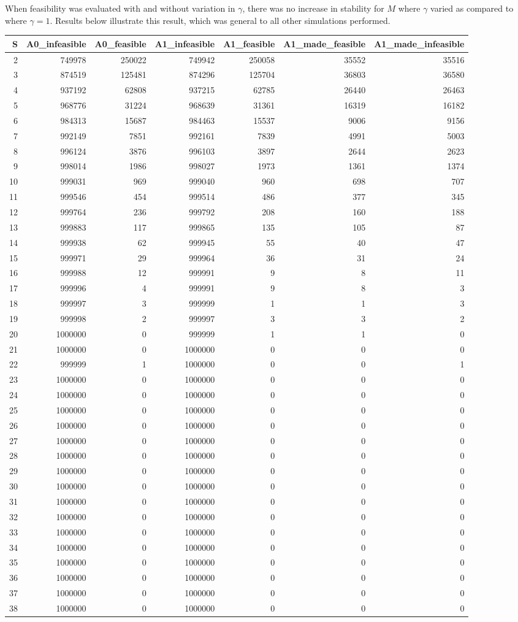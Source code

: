 \documentclass[]{article}
\begin{document}
When feasibility was evaluated with and without variation in \(\gamma\),
there was no increase in stability for \(M\) where \(\gamma\) varied as
compared to where \(\gamma = 1\). Results below illustrate this result,
which was general to all other simulations performed.

\begin{longtable}[]{@{}rrrrrrr@{}}
\toprule
S & A0\_infeasible & A0\_feasible & A1\_infeasible & A1\_feasible &
A1\_made\_feasible & A1\_made\_infeasible\tabularnewline
\midrule
\endhead
2 & 749978 & 250022 & 749942 & 250058 & 35552 & 35516\tabularnewline
3 & 874519 & 125481 & 874296 & 125704 & 36803 & 36580\tabularnewline
4 & 937192 & 62808 & 937215 & 62785 & 26440 & 26463\tabularnewline
5 & 968776 & 31224 & 968639 & 31361 & 16319 & 16182\tabularnewline
6 & 984313 & 15687 & 984463 & 15537 & 9006 & 9156\tabularnewline
7 & 992149 & 7851 & 992161 & 7839 & 4991 & 5003\tabularnewline
8 & 996124 & 3876 & 996103 & 3897 & 2644 & 2623\tabularnewline
9 & 998014 & 1986 & 998027 & 1973 & 1361 & 1374\tabularnewline
10 & 999031 & 969 & 999040 & 960 & 698 & 707\tabularnewline
11 & 999546 & 454 & 999514 & 486 & 377 & 345\tabularnewline
12 & 999764 & 236 & 999792 & 208 & 160 & 188\tabularnewline
13 & 999883 & 117 & 999865 & 135 & 105 & 87\tabularnewline
14 & 999938 & 62 & 999945 & 55 & 40 & 47\tabularnewline
15 & 999971 & 29 & 999964 & 36 & 31 & 24\tabularnewline
16 & 999988 & 12 & 999991 & 9 & 8 & 11\tabularnewline
17 & 999996 & 4 & 999991 & 9 & 8 & 3\tabularnewline
18 & 999997 & 3 & 999999 & 1 & 1 & 3\tabularnewline
19 & 999998 & 2 & 999997 & 3 & 3 & 2\tabularnewline
20 & 1000000 & 0 & 999999 & 1 & 1 & 0\tabularnewline
21 & 1000000 & 0 & 1000000 & 0 & 0 & 0\tabularnewline
22 & 999999 & 1 & 1000000 & 0 & 0 & 1\tabularnewline
23 & 1000000 & 0 & 1000000 & 0 & 0 & 0\tabularnewline
24 & 1000000 & 0 & 1000000 & 0 & 0 & 0\tabularnewline
25 & 1000000 & 0 & 1000000 & 0 & 0 & 0\tabularnewline
26 & 1000000 & 0 & 1000000 & 0 & 0 & 0\tabularnewline
27 & 1000000 & 0 & 1000000 & 0 & 0 & 0\tabularnewline
28 & 1000000 & 0 & 1000000 & 0 & 0 & 0\tabularnewline
29 & 1000000 & 0 & 1000000 & 0 & 0 & 0\tabularnewline
30 & 1000000 & 0 & 1000000 & 0 & 0 & 0\tabularnewline
31 & 1000000 & 0 & 1000000 & 0 & 0 & 0\tabularnewline
32 & 1000000 & 0 & 1000000 & 0 & 0 & 0\tabularnewline
33 & 1000000 & 0 & 1000000 & 0 & 0 & 0\tabularnewline
34 & 1000000 & 0 & 1000000 & 0 & 0 & 0\tabularnewline
35 & 1000000 & 0 & 1000000 & 0 & 0 & 0\tabularnewline
36 & 1000000 & 0 & 1000000 & 0 & 0 & 0\tabularnewline
37 & 1000000 & 0 & 1000000 & 0 & 0 & 0\tabularnewline
38 & 1000000 & 0 & 1000000 & 0 & 0 & 0\tabularnewline

\end{longtable}
\end{document}
